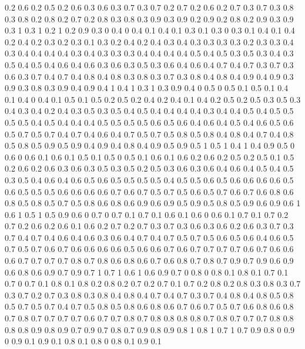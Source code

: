 0.2 0.6
0.2 0.5
0.2 0.6
0.3 0.6
0.3 0.7
0.3 0.7
0.2 0.7
0.2 0.6
0.2 0.7
0.3 0.7
0.3 0.8
0.3 0.8
0.2 0.8
0.2 0.7
0.2 0.8
0.3 0.8
0.3 0.9
0.3 0.9
0.2 0.9
0.2 0.8
0.2 0.9
0.3 0.9
0.3 1
0.3 1
0.2 1
0.2 0.9
0.3 0
0.4 0
0.4 0.1
0.4 0.1
0.3 0.1
0.3 0
0.3 0.1
0.4 0.1
0.4 0.2
0.4 0.2
0.3 0.2
0.3 0.1
0.3 0.2
0.4 0.2
0.4 0.3
0.4 0.3
0.3 0.3
0.3 0.2
0.3 0.3
0.4 0.3
0.4 0.4
0.4 0.4
0.3 0.4
0.3 0.3
0.3 0.4
0.4 0.4
0.4 0.5
0.4 0.5
0.3 0.5
0.3 0.4
0.3 0.5
0.4 0.5
0.4 0.6
0.4 0.6
0.3 0.6
0.3 0.5
0.3 0.6
0.4 0.6
0.4 0.7
0.4 0.7
0.3 0.7
0.3 0.6
0.3 0.7
0.4 0.7
0.4 0.8
0.4 0.8
0.3 0.8
0.3 0.7
0.3 0.8
0.4 0.8
0.4 0.9
0.4 0.9
0.3 0.9
0.3 0.8
0.3 0.9
0.4 0.9
0.4 1
0.4 1
0.3 1
0.3 0.9
0.4 0
0.5 0
0.5 0.1
0.5 0.1
0.4 0.1
0.4 0
0.4 0.1
0.5 0.1
0.5 0.2
0.5 0.2
0.4 0.2
0.4 0.1
0.4 0.2
0.5 0.2
0.5 0.3
0.5 0.3
0.4 0.3
0.4 0.2
0.4 0.3
0.5 0.3
0.5 0.4
0.5 0.4
0.4 0.4
0.4 0.3
0.4 0.4
0.5 0.4
0.5 0.5
0.5 0.5
0.4 0.5
0.4 0.4
0.4 0.5
0.5 0.5
0.5 0.6
0.5 0.6
0.4 0.6
0.4 0.5
0.4 0.6
0.5 0.6
0.5 0.7
0.5 0.7
0.4 0.7
0.4 0.6
0.4 0.7
0.5 0.7
0.5 0.8
0.5 0.8
0.4 0.8
0.4 0.7
0.4 0.8
0.5 0.8
0.5 0.9
0.5 0.9
0.4 0.9
0.4 0.8
0.4 0.9
0.5 0.9
0.5 1
0.5 1
0.4 1
0.4 0.9
0.5 0
0.6 0
0.6 0.1
0.6 0.1
0.5 0.1
0.5 0
0.5 0.1
0.6 0.1
0.6 0.2
0.6 0.2
0.5 0.2
0.5 0.1
0.5 0.2
0.6 0.2
0.6 0.3
0.6 0.3
0.5 0.3
0.5 0.2
0.5 0.3
0.6 0.3
0.6 0.4
0.6 0.4
0.5 0.4
0.5 0.3
0.5 0.4
0.6 0.4
0.6 0.5
0.6 0.5
0.5 0.5
0.5 0.4
0.5 0.5
0.6 0.5
0.6 0.6
0.6 0.6
0.5 0.6
0.5 0.5
0.5 0.6
0.6 0.6
0.6 0.7
0.6 0.7
0.5 0.7
0.5 0.6
0.5 0.7
0.6 0.7
0.6 0.8
0.6 0.8
0.5 0.8
0.5 0.7
0.5 0.8
0.6 0.8
0.6 0.9
0.6 0.9
0.5 0.9
0.5 0.8
0.5 0.9
0.6 0.9
0.6 1
0.6 1
0.5 1
0.5 0.9
0.6 0
0.7 0
0.7 0.1
0.7 0.1
0.6 0.1
0.6 0
0.6 0.1
0.7 0.1
0.7 0.2
0.7 0.2
0.6 0.2
0.6 0.1
0.6 0.2
0.7 0.2
0.7 0.3
0.7 0.3
0.6 0.3
0.6 0.2
0.6 0.3
0.7 0.3
0.7 0.4
0.7 0.4
0.6 0.4
0.6 0.3
0.6 0.4
0.7 0.4
0.7 0.5
0.7 0.5
0.6 0.5
0.6 0.4
0.6 0.5
0.7 0.5
0.7 0.6
0.7 0.6
0.6 0.6
0.6 0.5
0.6 0.6
0.7 0.6
0.7 0.7
0.7 0.7
0.6 0.7
0.6 0.6
0.6 0.7
0.7 0.7
0.7 0.8
0.7 0.8
0.6 0.8
0.6 0.7
0.6 0.8
0.7 0.8
0.7 0.9
0.7 0.9
0.6 0.9
0.6 0.8
0.6 0.9
0.7 0.9
0.7 1
0.7 1
0.6 1
0.6 0.9
0.7 0
0.8 0
0.8 0.1
0.8 0.1
0.7 0.1
0.7 0
0.7 0.1
0.8 0.1
0.8 0.2
0.8 0.2
0.7 0.2
0.7 0.1
0.7 0.2
0.8 0.2
0.8 0.3
0.8 0.3
0.7 0.3
0.7 0.2
0.7 0.3
0.8 0.3
0.8 0.4
0.8 0.4
0.7 0.4
0.7 0.3
0.7 0.4
0.8 0.4
0.8 0.5
0.8 0.5
0.7 0.5
0.7 0.4
0.7 0.5
0.8 0.5
0.8 0.6
0.8 0.6
0.7 0.6
0.7 0.5
0.7 0.6
0.8 0.6
0.8 0.7
0.8 0.7
0.7 0.7
0.7 0.6
0.7 0.7
0.8 0.7
0.8 0.8
0.8 0.8
0.7 0.8
0.7 0.7
0.7 0.8
0.8 0.8
0.8 0.9
0.8 0.9
0.7 0.9
0.7 0.8
0.7 0.9
0.8 0.9
0.8 1
0.8 1
0.7 1
0.7 0.9
0.8 0
0.9 0
0.9 0.1
0.9 0.1
0.8 0.1
0.8 0
0.8 0.1
0.9 0.1
